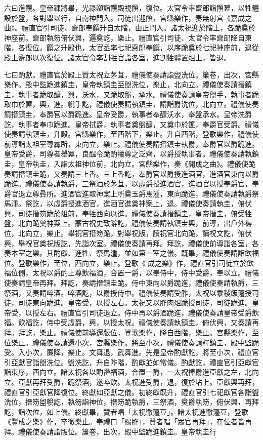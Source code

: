 \begin{pinyinscope}
 六曰進饌。皇帝祼將畢，光祿卿詣饌殿視饌，復位。太官令率齋郎詣饌幕，以牲體設於盤，各對舉以行，自南神門入。司徒出迎饌，宮縣樂作，奏無射宮《嘉成之曲》。禮直官引司徒、齋郎奉饌升自太階，由正門入。諸太祝迎於階上，各跪奠於神座前。齋郎執笏俯伏興，遍奠訖，樂止。禮直官引司徒、太官令率齋郎降自東階，各復位。饌之升殿也，太官丞率七祀齋郎奉饌，以序跪奠於七祀神座前，退從殿上齋郎以次復位。諸太官令率割牲官詣各室，進割牲體置俎上，皆退。



 七曰酌獻。禮直官於殿上贊太祝立茅苴，禮儀使奏請詣盥洗位。簾卷，出次，宮縣樂作。殿中監跪進鎮圭，皇帝執鎮圭至盥洗位，樂止，北向立。禮儀使奏請搢鎮圭，執事者跪取醿，興，沃水，又跪取盤，承水。禮儀使奏請皇帝盥手，執事者跪取巾於篚，興，進。帨手訖，禮儀使奏請執鎮圭，請詣爵洗位，北向立。禮儀使奏請搢鎮圭，奉爵官以爵跪進。皇帝受爵，執事者奉醿沃水，奉盤承水。皇帝洗爵訖，執事者奉巾跪進。皇帝拭爵，執事者奠盤醿，又奠巾於篚，奉爵官受爵。禮儀使奏請執鎮圭，升殿。宮縣樂作，至西階下，樂止。升自西階，登歌樂作，禮儀使前導詣太祖室尊彞所，東向立，樂止。禮儀使奏請搢鎮圭執爵，奉爵官以爵跪進。皇帝受爵，司尊者舉冪，良醖令跪酌犧尊之泛齊，以爵授執事者。禮儀使奏請執鎮圭，皇帝執圭，入詣太祖神位前，北向立。宮縣樂作，奏《開成之曲》。禮儀使跪奏請搢鎮圭跪，又奏請三上香。三上香訖，奉爵官以爵授進酒官，進酒官東向以爵跪進。禮儀使奏請執爵，三祭酒於茅苴，以虛爵授進酒官，進酒官以授奉爵官，奉爵官退立尊彞所。進酒官進取神案上所奠玉爵馬湩，東向跪進，禮儀使奏請執爵祭馬湩。祭訖，以虛爵授進酒官，進酒官進奠神案上，退。禮儀使奏請執圭，俯伏興，司徒搢笏跪於俎前，奉牲西向以進。禮儀使奏請搢鎮圭，皇帝搢圭，俯受牲盤，北向跪奠神案上。蒙古祝史致辭訖，禮儀使奏請執鎮圭興，前導，出戶外褥位，北向立，樂止。舉祝官搢笏跪，對舉祝版，讀祝官北向跪，讀祝文訖，俯伏興，舉祝官奠祝版訖，先詣次室。禮儀使奏請再拜。拜訖，禮儀使前導詣各室，各奏本室之樂。其酌獻、進牲、祭馬湩，並如第一室之儀。既畢，禮儀使奏請詣飲福位。登歌樂作，至位，西向立，樂止。登歌《成之樂》作，禮直官引司徒立於飲福位側，太祝以爵酌上尊飲福酒，合置一爵，以奉侍中，侍中受爵，奉以立。禮儀使奏請皇帝再拜。拜訖，奏請搢鎮圭跪。侍中東向以爵跪進，禮儀使奏請執爵，三祭酒，又奏請啐酒。啐酒訖，以爵授侍中。禮儀使奏請受胙，太祝以黍稷飯籩授司徒，司徒東向跪進。皇帝受，以授左右。太祝又以胙肉俎跪授司徒，司徒跪進。皇帝受，以授左右。禮直官引司徒退立。侍中再以爵酒跪進，禮儀使奏請皇帝受爵飲福。飲福訖，侍中受虛爵，興，以授太祝。禮儀使奏請執鎮圭，俯伏興，又奏請再拜。拜訖，樂止。禮儀使前導還版位，登歌樂作，降自西階，樂止。宮縣樂作，至位樂止。禮儀使奏請還小次，宮縣樂作。將至小次，禮儀使奏請釋鎮圭，殿中監跪受。入小次，簾降，樂止。文舞退，武舞進。先是皇帝酌獻訖，將至小次，禮直官引亞獻官詣盥洗位。盥洗訖，升自阼階，酌獻並如常儀。酌獻訖，禮直官引亞獻官詣東序，西向立。諸太祝各以酌罍福酒，合置一爵，一太祝捧爵進亞獻之左，北向立。亞獻再拜受爵，跪祭酒，遂啐飲。太祝進受爵，退，復於坫上。亞獻興再拜，禮直官引亞獻官降復位。終獻如亞獻之儀。初終獻既升，禮直官引七祀獻官各詣盥洗位，搢笏盥帨訖，執笏詣神位，搢笏跪執爵，三祭酒，奠爵執笏，俯伏興，再拜訖，詣次位，如上儀。終獻畢，贊者唱「太祝徹籩豆」。諸太祝進徹籩豆，登歌《豐成之樂》作，卒徹樂止。奉禮曰「賜胙」，贊者唱「眾官再拜」，在位者皆再拜。禮儀使奏請詣版位。簾卷，出次，殿中監跪進鎮圭。皇帝執圭行
\end{pinyinscope}
